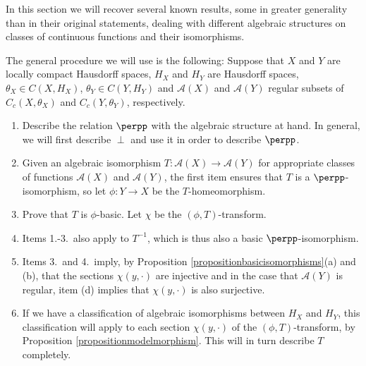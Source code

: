 In this section we will recover several known results, some in greater generality than in their original statements, dealing with different algebraic structures on classes of continuous functions and their isomorphisms.%
%

The general procedure we will use is the following: Suppose that $X$ and $Y$ are locally compact Hausdorff spaces, $H_X$ and $H_Y$ are Hausdorff spaces, $\theta_X\in C(X,H_X)$, $\theta_Y\in C(Y,H_Y)$ and $\mathcal{A}(X)$ and $\mathcal{A}(Y)$ regular subsets of $C_c(X,\theta_X)$ and $C_c(Y,\theta_Y)$, respectively.
\begin{enumerate}\label{generalprocedureforclassification}
\item Describe the relation $\perpp$ with the algebraic structure at hand. In general, we will first describe $\perp$ and use it in order to describe $\perpp$.
\item Given an algebraic isomorphism $T:\mathcal{A}(X)\to\mathcal{A}(Y)$ for appropriate classes of functions $\mathcal{A}(X)$ and $\mathcal{A}(Y)$, the first item ensures that $T$ is a $\perpp$-isomorphism, so let $\phi:Y\to X$ be the $T$-homeomorphism.
\item Prove that $T$ is $\phi$-basic. Let $\chi$ be the $(\phi,T)$-transform.
\item Items 1.-3.\ also apply to $T^{-1}$, which is thus also a basic $\perpp$-isomorphism.
\item Items 3.\ and 4.\  imply, by Proposition \ref{propositionbasicisomorphisms}(a) and (b), that the sections $\chi(y,\cdot)$ are injective and in the case that $\mathcal{A}(Y)$ is regular, item (d) implies that $\chi(y,\cdot)$ is also surjective.
\item If we have a classification of algebraic isomorphisms between $H_X$ and $H_Y$, this classification will apply to each section $\chi(y,\cdot)$ of the $(\phi,T)$-transform, by Proposition \ref{propositionmodelmorphism}. This will in turn describe $T$ completely.
\end{enumerate}

